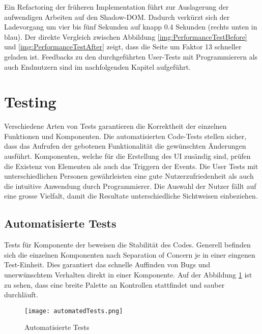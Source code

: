 Ein Refactoring der früheren Implementation führt zur Auslagerung der aufwendigen Arbeiten auf den Shadow-DOM.
Dadurch verkürzt sich der Ladevorgang um vier bis fünf Sekunden auf knapp 0.4 Sekunden (rechts unten in blau).
Der direkte Vergleich zwischen Abbildung \ref{img:PerformanceTestBefore} und \ref{img:PerformanceTestAfter} zeigt, dass die Seite um Faktor 13 schneller geladen ist.
Feedbacks zu den durchgeführten User-Tests mit Programmierern als auch Endnutzern sind im nachfolgenden Kapitel aufgeführt.


\section{Testing}
\label{sec:testing}

Verschiedene Arten von Tests garantieren die Korrektheit der einzelnen Funktionen und Komponenten.
Die automatisierten Code-Tests stellen sicher, dass das Aufrufen der gebotenen Funktionalität die gewünschten Änderungen ausführt.
Komponenten, welche für die Erstellung des UI zusändig sind, prüfen die Existenz von Elementen als auch das Triggern der Events.
Die User Tests mit unterschiedlichen Personen gewährleisten eine gute Nutzerzufriedenheit als auch die intuitive Anwendung durch Programmierer.
Die Auswahl der Nutzer fällt auf eine grosse Vielfalt, damit die Resultate unterschiedliche Sichtweisen einbeziehen. 


\subsection{Automatisierte Tests}
\label{sec:automatedTests}

Tests für Komponente der  beweisen die Stabilität des Codes.
Generell befinden sich die einzelnen Komponenten nach Separation of Concern je in einer eingenen Test-Einheit.
Dies garantiert das schnelle Auffinden von Bugs und unerwünschtem Verhalten direkt in einer Komponente.
Auf der Abbildung \ref{img:automatedTests} ist zu sehen, dass eine breite Palette an Kontrollen stattfindet und sauber durchläuft. 

\begin{figure}[!htb]
    \centering
    \texttt{[image: automatedTests.png]}
    \caption{Automatisierte Tests}
    \label{img:automatedTests}
\end{figure}

